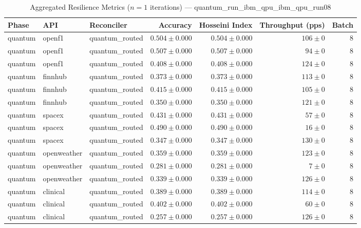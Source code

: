 
\begin{table}[htbp]
\caption{Aggregated Resilience Metrics ($n=1$ iterations) --- quantum_run_ibm_qpu_ibm_qpu_run08}
\begin{tabular}{l l l r r r r}
\hline
Phase & API & Reconciler & Accuracy & Hosseini Index & Throughput (pps) & Batch \\
\hline
quantum & openf1 & quantum\_routed & $0.504\pm0.000$ & $0.504\pm0.000$ & $106\pm0$ & 8 \\
quantum & openf1 & quantum\_routed & $0.507\pm0.000$ & $0.507\pm0.000$ & $94\pm0$ & 8 \\
quantum & openf1 & quantum\_routed & $0.408\pm0.000$ & $0.408\pm0.000$ & $124\pm0$ & 8 \\
quantum & finnhub & quantum\_routed & $0.373\pm0.000$ & $0.373\pm0.000$ & $113\pm0$ & 8 \\
quantum & finnhub & quantum\_routed & $0.415\pm0.000$ & $0.415\pm0.000$ & $105\pm0$ & 8 \\
quantum & finnhub & quantum\_routed & $0.350\pm0.000$ & $0.350\pm0.000$ & $121\pm0$ & 8 \\
quantum & spacex & quantum\_routed & $0.431\pm0.000$ & $0.431\pm0.000$ & $57\pm0$ & 8 \\
quantum & spacex & quantum\_routed & $0.490\pm0.000$ & $0.490\pm0.000$ & $16\pm0$ & 8 \\
quantum & spacex & quantum\_routed & $0.347\pm0.000$ & $0.347\pm0.000$ & $130\pm0$ & 8 \\
quantum & openweather & quantum\_routed & $0.359\pm0.000$ & $0.359\pm0.000$ & $123\pm0$ & 8 \\
quantum & openweather & quantum\_routed & $0.281\pm0.000$ & $0.281\pm0.000$ & $7\pm0$ & 8 \\
quantum & openweather & quantum\_routed & $0.339\pm0.000$ & $0.339\pm0.000$ & $126\pm0$ & 8 \\
quantum & clinical & quantum\_routed & $0.389\pm0.000$ & $0.389\pm0.000$ & $114\pm0$ & 8 \\
quantum & clinical & quantum\_routed & $0.402\pm0.000$ & $0.402\pm0.000$ & $60\pm0$ & 8 \\
quantum & clinical & quantum\_routed & $0.257\pm0.000$ & $0.257\pm0.000$ & $126\pm0$ & 8 \\

\end{tabular}
\end{table}
